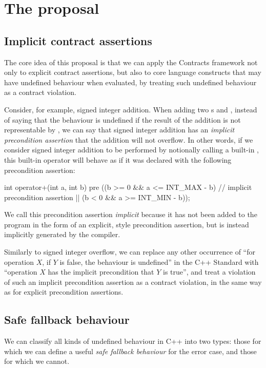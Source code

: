 \section{The proposal}

\subsection{Implicit contract assertions}

The core idea of this proposal is that we can apply the Contracts framework not only to explicit contract assertions, but also to core language constructs that may have undefined behaviour when evaluated, by treating such undefined behaviour as a contract violation.

Consider, for example, signed integer addition. When adding two s  and , instead of saying that the behaviour is undefined if the result of the addition is not representable by , we can say that signed integer addition has an \emph{implicit precondition assertion} that the addition will not overflow. In other words, if we consider signed integer addition to be performed by notionally calling a built-in , this built-in operator will behave as if it was declared with the following precondition assertion:
\begin{codeblock}
int operator+(int a, int b)
pre ((b >= 0 && a <= INT_MAX - b)  // implicit precondition assertion
  || (b < 0  && a >= INT_MIN - b));  
\end{codeblock}
We call this precondition assertion \emph{implicit} because it has not been added to the program in the form of an explicit, \cite{P2900R7} style precondition assertion, but is instead implicitly generated by the compiler.

Similarly to signed integer overflow, we can replace any other occurrence of ``for operation $X$, if $Y$ is false, the behaviour is undefined'' in the C++ Standard with ``operation $X$ has the implicit precondition that $Y$ is true'', and treat a violation of such an implicit precondition assertion as a contract violation, in the same way as for explicit precondition assertions.

\subsection{Safe fallback behaviour}

We can classify all kinds of undefined behaviour in C++ into two types: those for which we can define a useful \emph{safe fallback behaviour} for the error case, and those for which we cannot.

